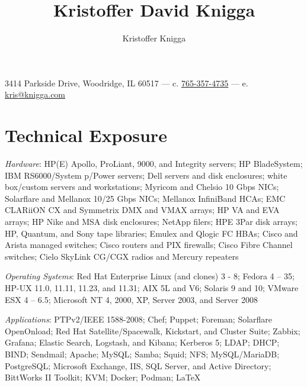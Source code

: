 \documentclass[9pt]{extarticle} %
\title{Kristoffer David Knigga}
\author{Kristoffer Knigga}
\begin{document}



3414 Parkside Drive, Woodridge, IL 60517 \hfill --- \hfill c. \href{tel:765-357-4735}{765-357-4735} \hfill --- \hfill e. \href{mailto:kris@knigga.com}{kris@knigga.com}


\section{Technical Exposure}

\textit{Hardware}: HP(E) Apollo, ProLiant, 9000, and Integrity servers; HP BladeSystem; IBM RS6000/System p/Power servers; Dell servers and disk enclosures; white box/custom servers and workstations; Myricom and Chelsio 10 Gbps NICs; Solarflare and Mellanox 10/25 Gbps NICs; Mellanox InfiniBand HCAs; EMC CLARiiON CX and Symmetrix DMX and VMAX arrays; HP VA and EVA arrays; HP Nike and MSA disk enclosures; NetApp filers; HPE 3Par disk arrays; HP, Quantum, and Sony tape libraries; Emulex and Qlogic FC HBAs; Cisco and Arista managed switches; Cisco routers and PIX firewalls; Cisco Fibre Channel switches; Cielo SkyLink CG/CGX radios and Mercury repeaters
\bigskip

\textit{Operating Systems}: Red Hat Enterprise Linux (and clones) 3 - 8; Fedora 4 -- 35; HP-UX 11.0, 11.11, 11.23, and 11.31; AIX 5L and V6; Solaris 9 and 10; VMware ESX 4 -- 6.5; Microsoft NT 4, 2000, XP, Server 2003, and Server 2008

\bigskip

\textit{Applications}: PTPv2/IEEE 1588-2008; Chef; Puppet; Foreman; Solarflare OpenOnload; Red Hat Satellite/Spacewalk, Kickstart, and Cluster Suite; Zabbix; Grafana; Elastic Search, Logstash, and Kibana; Kerberos 5; LDAP; DHCP; BIND; Sendmail; Apache; MySQL; Samba; Squid; NFS; MySQL/MariaDB; PostgreSQL; Microsoft Exchange, IIS, SQL Server, and Active Directory; BittWorks II Toolkit; KVM; Docker; Podman; \LaTeX{}
\end{document}

